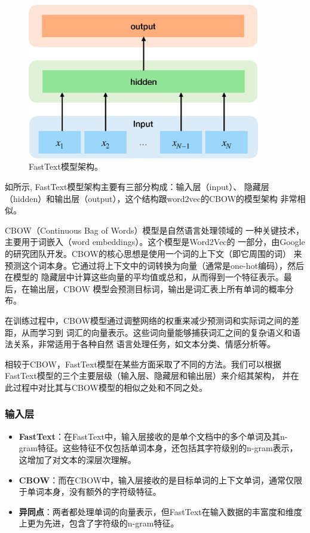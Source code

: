 \begin{figure}[th]
  \centering\includegraphics[width=4in]{figures/xulun/fasttext.eps}
  \caption{FastText模型架构。}
  \label{fig1:fasttext}
  \end{figure}

如所示, FastText模型架构主要有三部分构成：输入层（input）、
隐藏层（hidden）和输出层（output），这个结构跟word2vec的CBOW\cite{mikolov2013efficient}的模型架构
非常相似。

CBOW（Continuous Bag of Words）模型是自然语言处理领域的
一种关键技术，主要用于词嵌入（word embeddings）。这个模型是Word2Vec的
一部分，由Google的研究团队开发。CBOW的核心思想是使用一个词的上下文（即它周围的词）
来预测这个词本身。它通过将上下文中的词转换为向量（通常是one-hot编码），然后在模型的
隐藏层中计算这些向量的平均值或总和，从而得到一个特征表示。最后，在输出层，CBOW
模型会预测目标词，输出是词汇表上所有单词的概率分布。

在训练过程中，CBOW模型通过调整网络的权重来减少预测词和实际词之间的差距，从而学习到
词汇的向量表示。这些词向量能够捕获词汇之间的复杂语义和语法关系，非常适用于各种自然
语言处理任务，如文本分类、情感分析等。

相较于CBOW，FastText模型在某些方面采取了不同的方法。我们可以根据FastText模型的三个主要层级（输入层、隐藏层和输出层）来介绍其架构，
并在此过程中对比其与CBOW模型的相似之处和不同之处。

\subsubsection*{输入层}
\begin{itemize}
    \item \textbf{FastText}：在FastText中，输入层接收的是单个文档中的多个单词及其n-gram特征。这些特征不仅包括单词本身，还包括其字符级别的n-gram表示，这增加了对文本的深层次理解。
    \item \textbf{CBOW}：而在CBOW中，输入层接收的是目标单词的上下文单词，通常仅限于单词本身，没有额外的字符级特征。
    \item \textbf{异同点}：两者都处理单词的向量表示，但FastText在输入数据的丰富度和维度上更为先进，包含了字符级的n-gram特征。
\end{itemize}

